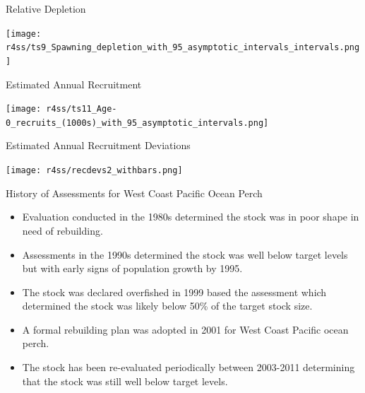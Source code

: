 \documentclass[pdf]{beamer}\usepackage[]{graphicx}\usepackage[]{color}
\begin{document}
\begin{frame}{Relative Depletion}
  \begin{center}
    \texttt{[image: r4ss/ts9\_Spawning\_depletion\_with\_95\_asymptotic\_intervals\_intervals.png]}
  \end{center}
\end{frame}


\begin{frame}{Estimated Annual Recruitment}
  \begin{center}
    \texttt{[image: r4ss/ts11\_Age-0\_recruits\_(1000s)\_with\_95\_asymptotic\_intervals.png]}
  \end{center}
\end{frame}

\begin{frame}{Estimated Annual Recruitment Deviations}
  \begin{center}
    \texttt{[image: r4ss/recdevs2\_withbars.png]}
  \end{center}
\end{frame}

\begin{frame}{History of Assessments for West Coast Pacific Ocean Perch}
  \begin{itemize}
    \item Evaluation conducted in the 1980s determined the stock was in poor shape in need of rebuilding.
    \item Assessments in the 1990s determined the stock was well below target levels but with early signs of population growth by 1995. 
    \item The stock was declared overfished in 1999 based the assessment which determined the stock was likely below 50\% of the target stock size.
    \item A formal rebuilding plan was adopted in 2001 for West Coast Pacific ocean perch.
    \item The stock has been re-evaluated periodically between 2003-2011 determining that the stock was still well below target levels. 
  \end{itemize}
\end{frame}
\end{document}
